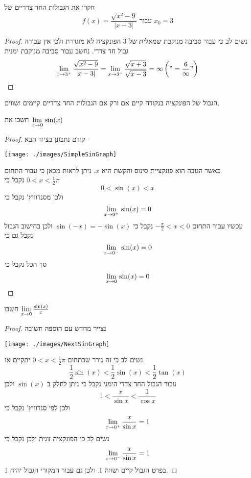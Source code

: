 \documentclass{article}
\begin{document}
\begin{exercise}
חקרו את הגבולות החד צדדיים של 
\[f(x)=\frac{\sqrt{x^2-9}}{|x-3|}\text{ עבור }x_0=3\]
\end{exercise}

\begin{proof}
נשים לב כי עבור סביבה מנוקבת שמאלית של 3 הפונקציה לא מוגדרת ולכן אין עבורה גבול חד צדדי. נחשב עבור סביבה מנוקבת ימנית 
\[\underset{x\rightarrow3^+}{\lim}\,\frac{\sqrt{x^2-9}}{|x-3|} = \underset{x\rightarrow3^+}{\lim}\,\frac{\sqrt{x+3}}{\sqrt{x-3}} = \infty \left("=\frac{6}{\infty}"\right)\]
\end{proof}

\newpage

\begin{theorem}
הגבול של הפונקציה בנקודה קיים אם ורק אם הגבולות החד צדדיים קיימים ושווים.
\end{theorem}

\begin{exercise}
חשבו את 
$\underset{x\rightarrow0}{\lim}\, \sin(x)$
\end{exercise}

\begin{proof}
קודם נתבונן בציור הבא - 
\begin{center}
\texttt{[image: ./images/SimpleSinGraph]}
\end{center}
כאשר הגובה הוא פונקציית סינוס והקשת היא 
$x$. 
ניתן לראות מכאן כי עבור התחום 
$0<x<\frac{1}{2}\pi$
נקבל כי 
\[0<\sin(x)<x\]
ולכן מסנדוויץ' נקבל כי 
\[\underset{x\rightarrow0^+}{\lim}\, \sin(x) = 0\]
עכשיו עבור התחום 
$-\frac{\pi}{2}<x<0$
נקבל כי 
$\sin(-x)=-\sin(x)$
ולכן בחישוב הגבול נקבל גם כי 
\[\underset{x\rightarrow0^-}{\lim}\, \sin(x) = 0\]
סך הכל נקבל כי 
\[\underset{x\rightarrow0}{\lim}\,\sin(x) = 0\]
\end{proof}

\begin{exercise}
חשבו 
$\underset{x\rightarrow0}{\lim}\,\frac{\sin(x)}{x}$
\end{exercise}

\begin{proof}
נצייר מחדש עם הוספה חשובה 
\begin{center}
\texttt{[image: ./images/NextSinGraph]}
\end{center}
נשים לב כי זה גורר שבתחום 
$0<x<\frac{1}{2}\pi$
יתקיים אז 
\[\frac{1}{2}\sin(x)<\frac{1}{2}\sin(x)<\frac{1}{2}\tan(x)\]
עבור הגבול החד צדדי הימני נקבל כי ניתן לחלק ב 
$\sin(x)$
ולכן 
\[1<\frac{x}{\sin x}<\frac{1}{\cos x}\]
ולכן לפי סנדוויץ' נקבל כי 
\[\underset{x\rightarrow0^+}{\lim}\,\frac{x}{\sin x} = 1\]
נשים לב כי הפונקציה זוגית ולכן נקבל כי 
\[\underset{x\rightarrow0^-}{\lim}\,\frac{x}{\sin x} = 1\]
בפרט הגבול קיים ושווה 1.
ולכן גם עבור המקורי הגבול יהיה 1.
\end{proof}
\end{document}
